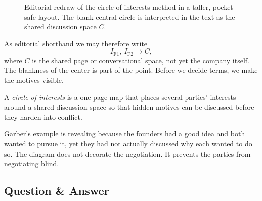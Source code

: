 \begin{figure}[h]
\centering
{}
\caption{Editorial redraw of the circle-of-interests method in a taller, pocket-safe layout. The blank central circle is interpreted in the text as the shared discussion space \(C\).}
\end{figure}

As editorial shorthand we may therefore write
\begin{equation}
I_{\mathrm{F1}},\ I_{\mathrm{F2}} \longrightarrow C,
\end{equation}
where \(C\) is the shared page or conversational space, not yet the company itself. The blankness of the center is part of the point. Before we decide terms, we make the motives visible.

\begin{definition}
A \emph{circle of interests} is a one-page map that places several parties' interests around a shared discussion space so that hidden motives can be discussed before they harden into conflict.
\end{definition}

Garber's example is revealing because the founders had a good idea and both wanted to pursue it, yet they had not actually discussed why each wanted to do so. The diagram does not decorate the negotiation. It prevents the parties from negotiating blind.

\subsection{Question \& Answer}

